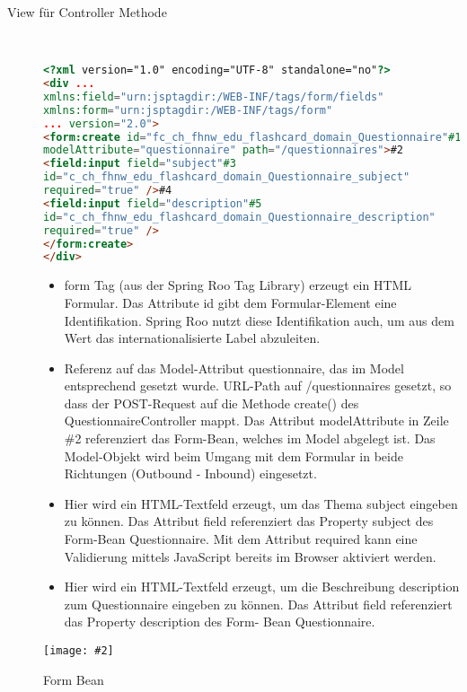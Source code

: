 \documentclass[a4paper,10pt]{scrreprt}
\newcommand{\pic}[2][figure]{\begin{figure}[h]
 \centering
 \texttt{[image: \#2]}
 \caption{#1}
\end{figure}
}
\begin{document}
{\begin{description}
\item[View für Controller Methode] \hfill \\
\begin{lstlisting}[caption=View mit Form Spring,language=html]
 <?xml version="1.0" encoding="UTF-8" standalone="no"?>
<div ...
xmlns:field="urn:jsptagdir:/WEB-INF/tags/form/fields"
xmlns:form="urn:jsptagdir:/WEB-INF/tags/form"
... version="2.0">
<form:create id="fc_ch_fhnw_edu_flashcard_domain_Questionnaire"#1
modelAttribute="questionnaire" path="/questionnaires">#2
<field:input field="subject"#3
id="c_ch_fhnw_edu_flashcard_domain_Questionnaire_subject"
required="true" />#4
<field:input field="description"#5
id="c_ch_fhnw_edu_flashcard_domain_Questionnaire_description"
required="true" />
</form:create>
</div>
\end{lstlisting}
\begin{itemize}
 \item form Tag (aus der Spring Roo Tag Library) erzeugt ein HTML Formular. Das Attribute id gibt
dem Formular-Element eine Identifikation. Spring Roo nutzt diese Identifikation auch, um aus
dem Wert das internationalisierte Label abzuleiten.
\item Referenz auf das Model-Attribut questionnaire, das im Model entsprechend gesetzt wurde.
URL-Path auf /questionnaires gesetzt, so dass der POST-Request auf die Methode
create() des QuestionnaireController mappt. Das Attribut modelAttribute in Zeile \#2 referenziert das Form-Bean, 
welches 
im Model abgelegt
ist. Das Model-Objekt wird beim Umgang mit dem Formular in beide Richtungen (Outbound -
Inbound) eingesetzt.
\item Hier wird ein HTML-Textfeld erzeugt, um das Thema subject eingeben zu können. Das
Attribut field referenziert das Property subject des Form-Bean Questionnaire.
Mit dem Attribut required kann eine Validierung mittels JavaScript bereits im Browser
aktiviert werden.
\item Hier wird ein HTML-Textfeld erzeugt, um die Beschreibung description zum Questionnaire
eingeben zu können. Das Attribut field referenziert das Property description des Form-
Bean Questionnaire.

\end{itemize}
\end{description}

\pic[Form Bean]{fb.png}

}
\end{document}
